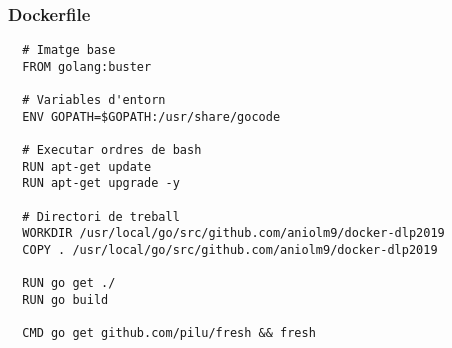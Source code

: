 \begin{frame}[containsverbatim]
  \frametitle{Dockerfile}
  \footnotesize
  \begin{lstlisting}
  # Imatge base
  FROM golang:buster
  
  # Variables d'entorn
  ENV GOPATH=$GOPATH:/usr/share/gocode
  
  # Executar ordres de bash
  RUN apt-get update
  RUN apt-get upgrade -y
  
  # Directori de treball
  WORKDIR /usr/local/go/src/github.com/aniolm9/docker-dlp2019
  COPY . /usr/local/go/src/github.com/aniolm9/docker-dlp2019
  
  RUN go get ./
  RUN go build
  
  CMD go get github.com/pilu/fresh && fresh
  \end{lstlisting}
\end{frame}
